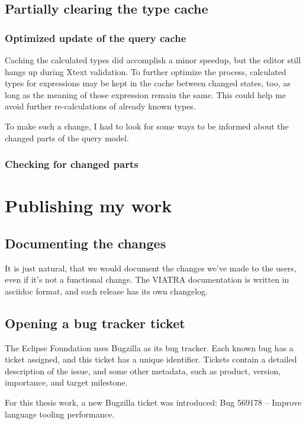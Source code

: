 \documentclass[11pt,a4paper,oneside]{report}
\begin{document}
\section{Partially clearing the type cache}
\subsection{Optimized update of the query cache}
Caching the calculated types did accomplish a minor speedup, but the editor
still hangs up during Xtext validation. To further optimize the process,
calculated types for expressions may be kept in the cache between changed
states, too, as long as the meaning of those expression remain the same. This
could help me avoid further re-calculations of already known types.

To make such a change, I had to look for some ways to be informed about the
changed parts of the query model.

\subsection{Checking for changed parts}

\chapter{Publishing my work}
\section{Documenting the changes}
It is just natural, that we would document the changes we've made to the users,
even if it's not a functional change. The VIATRA documentation is written in
asciidoc format, and each release has its own changelog.

\section{Opening a bug tracker ticket}
The Eclipse Foundation uses Bugzilla as its bug tracker. Each known bug has a
ticket assigned, and this ticket has a unique identifier. Tickets contain
a detailed description of the issue, and some other metadata, such as product,
version, importance, and target milestone.

For this thesis work, a new Bugzilla ticket was introduced:
Bug 569178 -- Improve language tooling performance.
\end{document}
